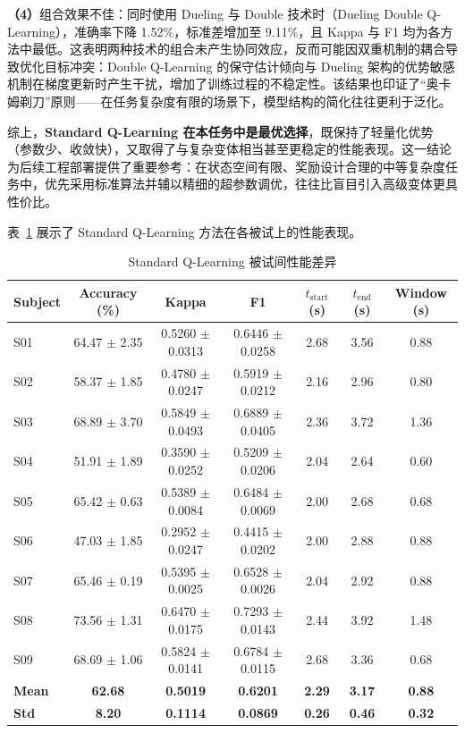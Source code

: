\textbf{（4）}组合效果不佳：同时使用 Dueling 与 Double 技术时（Dueling Double Q-Learning），准确率下降 1.52\%，标准差增加至 9.11\%，且 Kappa 与 F1 均为各方法中最低。这表明两种技术的组合未产生协同效应，反而可能因双重机制的耦合导致优化目标冲突：Double Q-Learning 的保守估计倾向与 Dueling 架构的优势敏感机制在梯度更新时产生干扰，增加了训练过程的不稳定性。该结果也印证了“奥卡姆剃刀”原则——在任务复杂度有限的场景下，模型结构的简化往往更利于泛化。

综上，\textbf{Standard Q-Learning 在本任务中是最优选择}，既保持了轻量化优势（参数少、收敛快），又取得了与复杂变体相当甚至更稳定的性能表现。这一结论为后续工程部署提供了重要参考：在状态空间有限、奖励设计合理的中等复杂度任务中，优先采用标准算法并辅以精细的超参数调优，往往比盲目引入高级变体更具性价比。

\label{subsec:subject_variability}

表~\ref{tab:subject_variability} 展示了 Standard Q-Learning 方法在各被试上的性能表现。

\begin{table}[H]
\centering
\caption{Standard Q-Learning 被试间性能差异}
\label{tab:subject_variability}
\footnotesize
\begin{tabular}{lcccccc}
\hline
\textbf{Subject} & \textbf{Accuracy (\%)} & \textbf{Kappa} & \textbf{F1} & \textbf{$t_{\text{start}}$ (s)} & \textbf{$t_{\text{end}}$ (s)} & \textbf{Window (s)} \\
\hline
S01 & 64.47 $\pm$ 2.35 & 0.5260 $\pm$ 0.0313 & 0.6446 $\pm$ 0.0258 & 2.68 & 3.56 & 0.88 \\
S02 & 58.37 $\pm$ 1.85 & 0.4780 $\pm$ 0.0247 & 0.5919 $\pm$ 0.0212 & 2.16 & 2.96 & 0.80 \\
S03 & 68.89 $\pm$ 3.70 & 0.5849 $\pm$ 0.0493 & 0.6889 $\pm$ 0.0405 & 2.36 & 3.72 & 1.36 \\
S04 & 51.91 $\pm$ 1.89 & 0.3590 $\pm$ 0.0252 & 0.5209 $\pm$ 0.0206 & 2.04 & 2.64 & 0.60 \\
S05 & 65.42 $\pm$ 0.63 & 0.5389 $\pm$ 0.0084 & 0.6484 $\pm$ 0.0069 & 2.00 & 2.68 & 0.68 \\
S06 & 47.03 $\pm$ 1.85 & 0.2952 $\pm$ 0.0247 & 0.4415 $\pm$ 0.0202 & 2.00 & 2.88 & 0.88 \\
S07 & 65.46 $\pm$ 0.19 & 0.5395 $\pm$ 0.0025 & 0.6528 $\pm$ 0.0026 & 2.04 & 2.92 & 0.88 \\
S08 & 73.56 $\pm$ 1.31 & 0.6470 $\pm$ 0.0175 & 0.7293 $\pm$ 0.0143 & 2.44 & 3.92 & 1.48 \\
S09 & 68.69 $\pm$ 1.06 & 0.5824 $\pm$ 0.0141 & 0.6784 $\pm$ 0.0115 & 2.68 & 3.36 & 0.68 \\
\hline
\textbf{Mean} & \textbf{62.68} & \textbf{0.5019} & \textbf{0.6201} & \textbf{2.29} & \textbf{3.17} & \textbf{0.88} \\
\textbf{Std} & \textbf{8.20} & \textbf{0.1114} & \textbf{0.0869} & \textbf{0.26} & \textbf{0.46} & \textbf{0.32} \\
\hline
\end{tabular}
\end{table}

